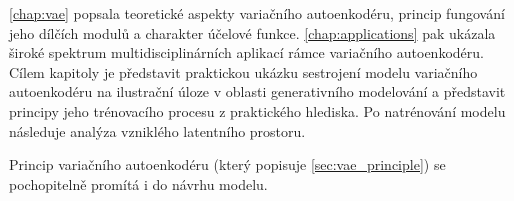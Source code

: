 \autoref{chap:vae} popsala teoretické aspekty variačního autoenkodéru, princip fungování jeho dílčích modulů a charakter účelové funkce.
\autoref{chap:applications} pak ukázala široké spektrum multidisciplinárních aplikací rámce variačního autoenkodéru.
Cílem  kapitoly je představit praktickou ukázku sestrojení modelu variačního autoenkodéru na ilustrační úloze v oblasti generativního modelování a představit principy jeho trénovacího procesu z praktického hlediska.
Po natrénování modelu následuje analýza vzniklého latentního prostoru.

Princip variačního autoenkodéru (který popisuje \autoref{sec:vae_principle}) se pochopitelně promítá i do návrhu modelu.